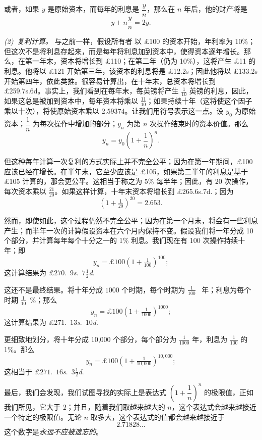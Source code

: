 \documentclass{ctexbook}
\newcommand{\Paragraph}[1]{\medskip\pagebreak[1]\par\textit{#1}}
\newcommand{\Pagelabel}[1]
  {\phantomsection\label{#1}}
\newcommand{\DPtypo}[2]{#2}%
\begin{document}
或者，如果 \( y \) 是原始资本，而每年的利息是 \( \dfrac{y}{n} \)，那么在 \( n \) 年后，他的财产将是
\[
y + n\dfrac{y}{n} = 2y.
\]

\Paragraph{{\upshape(2)}~复利计算。} 与之前一样，假设所有者
\Pagelabel{erratum0}%
以 £100 的资本开始，年利率为 10\%；但这次不是将利息存起来，而是每年将利息加到资本中，使得资本逐年增长。那么，在第一年末，资本将增长到 £110；在第二年（仍为 10\%），这将产生 £11 的利息。他将以 £121 开始第三年，该资本的利息将是 £12.2s；因此他将以 £133.2s 开始第四年，依此类推。很容易计算出，在十年末，总资本将增长到 £259.7s.6d。事实上，我们看到在每年末，每英镑将产生 \( \tfrac{1}{10} \) 英镑的利息，因此，如果这总是被加到资本中，每年资本将乘以 \( \tfrac{11}{10} \)；如果持续十年（这将使这个因子乘以十次），将使原始资本乘以 \( \DPtypo{2.59375}{2.59374} \)。让我们用符号表示这一点。设 \( y_0 \) 为原始资本；\( \dfrac{1}{n} \) 为每次操作中增加的部分；\( y_n \) 为第 \( n \) 次操作结束时的资本价值。那么
\[
y_n = y_0\left(1 + \frac{1}{n}\right)^n.
\]

但这种每年计算一次复利的方式实际上并不完全公平；因为在第一年期间，£100 应该已经在增长。在半年末，它至少应该是 £105，如果第二半年的利息是基于 £105 计算的，那会更公平。这相当于称之为 5\% 每半年；因此，有 20 次操作，每次资本乘以 \( \tfrac{21}{20} \)。如果这样计算，十年末资本将增长到
\DPtypo{£265.8s.}
       {£265.6s.7d.}；因为
\[
(1 + \tfrac{1}{20})^{20} = \DPtypo{2.654}{2.653}.
\]

然而，即使如此，这个过程仍然不完全公平；因为在第一个月末，将会有一些利息产生；而半年一次的计算假设资本在六个月内保持不变。假设我们将一年分成 10 个部分，并计算每年每个十分之一的 1\% 利息。我们现在有 100 次操作持续十年；即
\[
y_n = £100 \left( 1 + \tfrac{1}{100} \right)^{100};
\]
这计算结果为
\DPtypo{£$270$.~$8$\textit{s}.}
       {£$270$.~$9$\textit{s}.~$7\frac{1}{2}$\textit{d}.}

这还不是最终结果。将十年分成 $1000$ 个时期，每个时期为 $\frac{1}{100}$~ 年；利息为每个时期 $\frac{1}{10}$~\%；那么
\[
y_n = £100 \left( 1 + \tfrac{1}{1000} \right)^{1000};
\]
这计算结果为
\DPtypo{£$271$.~$14$\textit{s}.~$2\frac{1}{2}$\textit{d}.}
       {£$271$.~$13$\textit{s}.~$10$\textit{d}.}

更细致地划分，将十年分成 10,000 个部分，每个部分为 \( \frac{1}{1000} \) 年，利息为 \( \frac{1}{100} \) 的 1\%。那么
\[
y_n = £100 \left( 1 + \tfrac{1}{10,000} \right)^{10,000};
\]
这相当于
\DPtypo{£$271$.~$16$\textit{s}.~$4$\textit{d}.}
       {£$271$.~$16$\textit{s}.~$3\frac{1}{2}$\textit{d}.}

最后，我们会发现，我们试图寻找的实际上是表达式
$\left(1 + \dfrac{1}{n}\right)^n$ 的极限值，正如我们所见，它大于 $2$；并且，随着我们取越来越大的 $n$，这个表达式会越来越接近一个特定的极限值。无论 $n$ 取多大，这个表达式的值都会越来越接近于
\[
2.71828\ldots
\]
这个数字是\emph{永远不应被遗忘的}。
\end{document}
